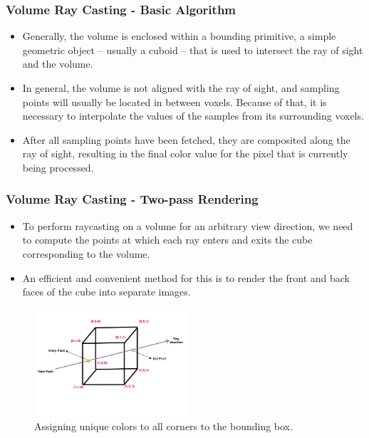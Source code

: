 \documentclass{beamer}
\begin{document}
\begin{frame}
\frametitle{Volume Ray Casting -  Basic Algorithm}
\begin{itemize}
\item Generally, the volume is enclosed within a bounding primitive, a simple geometric object – usually a cuboid – that is used to intersect the ray of sight and the volume.
\item In general, the volume is not aligned with the ray of sight, and sampling points will usually be located in between voxels. Because of that, it is necessary to interpolate the values of the samples from its surrounding voxels.
\item After all sampling points have been fetched, they are composited along the ray of sight, resulting in the final color value for the pixel that is currently being processed.
\end{itemize}
\end{frame}



\begin{frame}
\frametitle{Volume Ray Casting -  Two-pass Rendering}
\begin{itemize}
\item To perform raycasting on a volume for an arbitrary view direction, we need to compute the points at which each ray enters and exits the cube corresponding to the volume.
\item An efficient and convenient method for this is to render the front and back
faces of the cube into separate images.
\end{itemize}
\begin{figure}
\centering
\includegraphics[width=160pt]{cube.png}
\caption{Assigning unique colors to all corners to the bounding box.}
\end{figure}
\end{frame}
\end{document}
